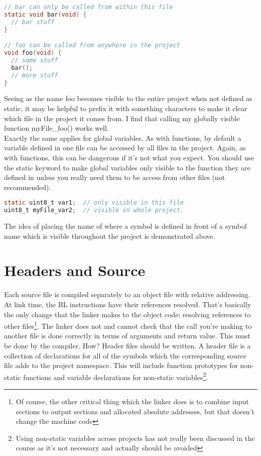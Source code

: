 \begin{lstlisting}[language=C]
// bar can only be called from within this file
static void bar(void) {
  // bar stuff
}

// foo can be called from anywhere in the project
void foo(void) {
  // some stuff
  bar();
  // more stuff
}
\end{lstlisting}

Seeing as the name foo becomes visible to the entire project when not defined as static, it may be helpful to prefix it with something characters to make it clear which file in the project it comes from. I find that calling my globally visible function myFile\_foo() works well. \\

Exactly the same applies for global variables. As with functions, by default a variable defined in one file can be accessed by all files in the project. Again, as with functions, this can be dangerous if it's not what you expect. You should use the static keyword to make global variables only visible to the function they are defined in unless you really need them to be access from other files (not recommended).

\begin{lstlisting}[language=C]
static uint8_t var1;  // only visible in this file
uint8_t myFile_var2;  // visible in whole project.
\end{lstlisting}

The idea of placing the name of where a symbol is defined in front of a symbol name which is visible throughout the project is demonstrated above. 

\section{Headers and Source}
Each source file is compiled separately to an object file with relative addressing.
At link time, the BL instructions have their references resolved. That's basically the only change that the linker makes to the object code: resolving references to other files\footnote{Of course, the other critical thing which the linker does is to combine input sections to output sections and allocated absolute addresses, but that doesn't change the machine code}.
The linker does not and cannot check that the call you're making to another file is done correctly in terms of arguments and return value.
This must be done by the compiler. How?
Header files should be written. A header file is a collection of declarations for all of the symbols which the corresponding source file adds to the project namespace.
This will include function prototypes for non-static functions and variable declarations for non-static variables\footnote{Using non-static variables across projects has not really been discussed in the course as it's not necessary and actually should be avoided}. 


